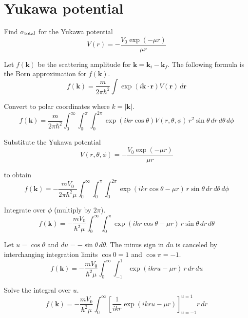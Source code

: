

\section*{Yukawa potential}

Find $\sigma_{\rm total}$ for the Yukawa potential
\begin{equation*}
V(r)=-\frac{V_0\exp(-\mu r)}{\mu r}
\end{equation*}

Let $f(\mathbf k)$ be the scattering amplitude for $\mathbf k=\mathbf k_i-\mathbf k_f$.
The following formula is the Born approximation for $f(\mathbf k)$.
\begin{equation*}
f(\mathbf k)
=\frac{m}{2\pi\hbar^2}
\int\exp(i\mathbf k\cdot\mathbf r)V(\mathbf r)\,d\mathbf r
\end{equation*}

Convert to polar coordinates where $k=|\mathbf k|$.
\begin{equation*}
f(\mathbf k)
=\frac{m}{2\pi\hbar^2}
\int_0^\infty
\int_0^\pi
\int_0^{2\pi}
\exp(ikr\cos\theta)V(r,\theta,\phi)
\,r^2\sin\theta\,dr\,d\theta\,d\phi
\end{equation*}

Substitute the Yukawa potential
\begin{equation*}
V(r,\theta,\phi)=-\frac{V_0\exp(-\mu r)}{\mu r}
\end{equation*}

to obtain
\begin{equation*}
f(\mathbf k)
=-\frac{mV_0}{2\pi\hbar^2\mu}
\int_0^\infty
\int_0^\pi
\int_0^{2\pi}
\exp(ikr\cos\theta-\mu r)
\,r\sin\theta\,dr\,d\theta\,d\phi
\end{equation*}

Integrate over $\phi$ (multiply by $2\pi$).
\begin{equation*}
f(\mathbf k)
=-\frac{mV_0}{\hbar^2\mu}
\int_0^\infty
\int_0^\pi
\exp(ikr\cos\theta-\mu r)
\,r\sin\theta\,dr\,d\theta
\end{equation*}

Let $u=\cos\theta$ and $du=-\sin\theta\,d\theta$.
The minus sign in $du$ is canceled by interchanging integration limits
$\cos0=1$ and $\cos\pi=-1$.
\begin{equation*}
f(\mathbf k)
=-\frac{mV_0}{\hbar^2\mu}
\int_0^\infty
\int_{-1}^1
\exp(ikru-\mu r)
\,r\,dr\,du
\end{equation*}

Solve the integral over $u$.
\begin{equation*}
f(\mathbf k)=-\frac{mV_0}{\hbar^2\mu}
\int_0^\infty
\left[\frac{1}{ikr}\exp(ikru-\mu r)\right]_{u=-1}^{u=1}
r\,dr
\end{equation*}

